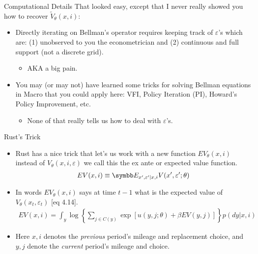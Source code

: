 \documentclass[aspectratio=169,11pt]{beamer}
\begin{document}
\begin{frame}{Computational Details}
That looked easy, except that I never really showed you how to recover $\tilde{V}_{\theta}(x,i)$:
\begin{itemize}
\item Directly iterating on Bellman's operator requires keeping track of $\varepsilon$'s which are: (1) unobserved to you the econometrician and (2) continuous and full support (not a discrete grid).
\begin{itemize}
\item AKA a big pain.
\end{itemize}
\item You may (or may not) have learned some tricks for solving Bellman equations in Macro that you could apply here: VFI, Policy Iteration (PI), Howard's Policy Improvement, etc.
\begin{itemize}
\item None of that really tells us how to deal with $\varepsilon$'s.
\end{itemize}
\end{itemize}
\end{frame}

\begin{frame}{Rust's Trick}\

\begin{itemize}
\item Rust has a nice trick that let's us work with a new function $EV_{\theta}(x,i)$ instead of $V_{\theta}(x,i,\varepsilon)$ we call this the \alert{ex ante} or \alert{expected value function}.
\begin{eqnarray*}
EV(x, i) \equiv \E_{x', \varepsilon ' | x, i} V(x', \varepsilon ' ; \theta)
\end{eqnarray*}
\item In words $EV_{\theta}(x,i)$ says at time $t-1$ what is the expected value of $V_{\theta}(x_t,\varepsilon_t)$ [eq 4.14].
\begin{align*}
EV(x,i) = \int_y \log \left \{ \sum_{j \in C(y)} \exp [ u(y,j; \theta) + \beta EV(y, j)] \right \} p(dy|x,i)
\end{align*}
\item Here $x, i$ denotes the \emph{previous} period's mileage and replacement choice, and $y, j$ denote the \emph{current} period's mileage and choice. 
\end{itemize}
\end{frame}
\end{document}
